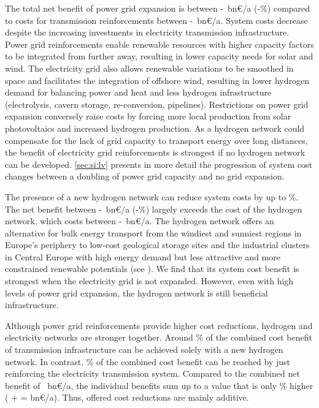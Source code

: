 The total net benefit of power grid expansion is between
\minacbenefitabs-\maxacbenefitabs~bn\euro/a
(\minacbenefitrel-\maxacbenefitrel\%) compared to costs for transmission
reinforcements between \minaccost-\maxaccost~bn\euro/a. System costs decrease
despite the increasing investments in electricity transmission infrastructure.
Power grid reinforcements enable renewable resources with higher capacity
factors to be integrated from further away, resulting in lower capacity needs
for solar and wind. The electricity grid also allows renewable variations to be
smoothed in space and facilitates the integration of offshore wind, resulting in
lower hydrogen demand for balancing power and heat and less hydrogen
infrastructure (electrolysis, cavern storage, re-conversion, pipelines).
Restrictions on power grid expansion conversely raise costs by forcing more
local production from solar photovoltaics and increased hydrogen production. As
a hydrogen network could compensate for the lack of grid capacity to transport
energy over long distances, the benefit of electricity grid reinforcements is
strongest if no hydrogen network can be developed. \cref{sec:si:lv} presents in
more detail the progression of system cost changes between a doubling of power
grid capacity and no grid expansion.

The presence of a new hydrogen network can reduce system costs by up to
\maxhybenefitrel\%. The net benefit between
\minhybenefitabs-\maxhybenefitabs~bn\euro/a
(\minhybenefitrel-\maxhybenefitrel\%) largely exceeds the cost of the hydrogen
network, which costs between \minhycost-\maxhycost~bn\euro/a. The hydrogen
network offers an alternative for bulk energy transport from the windiest and
sunniest regions in Europe's periphery to low-cost geological storage sites and
the industrial clusters in Central Europe with high energy demand but less
attractive and more constrained renewable potentials (see
). We find that its system cost benefit is strongest
when the electricity grid is not expanded. However, even with high levels of
power grid expansion, the hydrogen network is still beneficial infrastructure.

Although power grid reinforcements provide higher cost reductions, hydrogen and
electricity networks are stronger together. Around \hyoftotalbenefit\% of the
combined cost benefit of transmission infrastructure can be achieved solely with
a new hydrogen network. In contrast, \acoftotalbenefit\% of the combined cost
benefit can be reached by just reinforcing the electricity transmission system.
Compared to the combined net benefit of \gridbenefitabs~bn\euro/a, the
individual benefits sum up to a value that is only \additivebenefitrel\% higher
(\maxacbenefitabs{} + \maxhybenefitabs{} = \additivebenefitabs{} bn\euro/a).
Thus, offered cost reductions are mainly additive.

